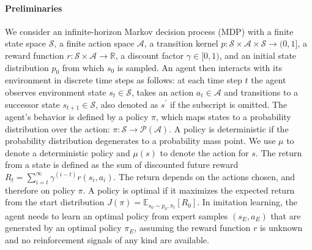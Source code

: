 \documentclass[letterpaper]{article} %
\begin{document}
\paragraph{Preliminaries}
We consider an infinite-horizon Markov decision process (MDP) with a finite state space $\mathcal{S}$,
a finite action space $\mathcal{A}$,
a transition kernel $p: \mathcal{S}\times\mathcal{A}\times\mathcal{S}\rightarrow (0, 1]$,
a reward function $r: \mathcal{S}\times\mathcal{A}\rightarrow\mathbb{R}$,
a discount factor $\gamma \in [0, 1)$,
and an initial state distribution $p_0$ from which $s_0$ is sampled.
An agent then interacts with its environment in discrete time steps as follows:
at each time step $t$ the agent observes environment state $s_t\in\mathcal{S}$,
takes an action $a_t\in\mathcal{A}$ and transitions to a successor state $s_{t+1}\in\mathcal{S}$,
also denoted as $s^\prime$ if the subscript is omitted.
The agent's behavior is defined by a policy $\pi$,
which maps states to a probability distribution over the action: $\pi: \mathcal{S}\rightarrow \mathcal{P}(\mathcal{A})$.
A policy is deterministic if the probability distribution degenerates to a probability mass point.
We use $\mu$ to denote a deterministic policy and $\mu(s)$ to denote the action for $s$.
The return from a state is defined as the sum of discounted future reward $R_t=\sum_{i=t}^{\infty}\gamma^{(i-t)}r(s_i, a_i)$.
The return depends on the actions chosen, and therefore on policy $\pi$.
A policy is optimal if it maximizes the expected return from the start distribution $J(\pi)=\mathbb{E}_{s_0\sim p_0, \pi_t}[R_0]$.
In imitation learning, the agent needs to learn an optimal policy from expert samples $(s_E, a_E)$ that are generated by an optimal policy $\pi_E$,
assuming the reward function $r$ is unknown and no reinforcement signals of any kind are available.
\end{document}

